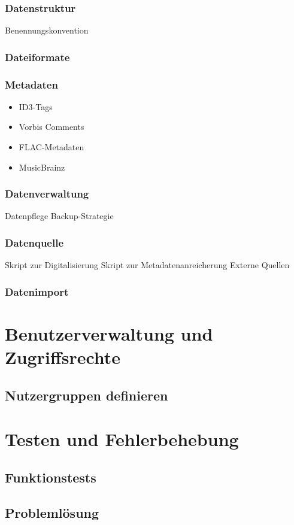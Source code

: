 \documentclass[12pt,a4paper]{report}
\begin{document}
    \subsubsection{Datenstruktur}
    Benennungskonvention
  \subsubsection{Dateiformate}
  \subsubsection{Metadaten}
    \begin{itemize}
      \item ID3-Tags
      \item Vorbis Comments
      \item FLAC-Metadaten
      \item MusicBrainz
    \end{itemize}
  \subsubsection{Datenverwaltung}
    Datenpflege
    Backup-Strategie
  \subsubsection{Datenquelle}
    Skript zur Digitalisierung
    Skript zur Metadatenanreicherung
    Externe Quellen
  \subsubsection{Datenimport}
\section{Benutzerverwaltung und Zugriffsrechte}
  \subsection{Nutzergruppen definieren}
\section{Testen und Fehlerbehebung}
  \subsection{Funktionstests}
  \subsection{Problemlösung}   
\end{document}
